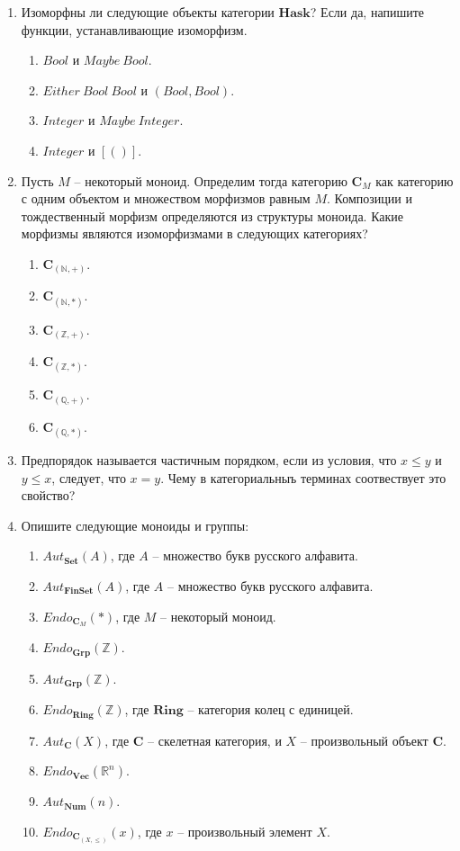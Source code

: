 \documentclass[draft]{article}
\newcommand{\cat}[1]{\mathbf{#1}}
\renewcommand{\C}{\cat{C}}
\newcommand{\Set}{\cat{Set}}
\newcommand{\FinSet}{\cat{FinSet}}
\newcommand{\Grp}{\cat{Grp}}
\newcommand{\Vec}{\cat{Vec}}
\newcommand{\Hask}{\cat{Hask}}
\newcommand{\Num}{\cat{Num}}
\begin{document}
\begin{enumerate}

\item Изоморфны ли следующие объекты категории $\Hask$? Если да, напишите функции, устанавливающие изоморфизм.
\begin{enumerate}
\item $Bool$ и $Maybe\ Bool$.
\item $Either\ Bool\ Bool$ и $(Bool, Bool)$.
\item $Integer$ и $Maybe\ Integer$.
\item $Integer$ и $[()]$.
\end{enumerate}

\item Пусть $M$ -- некоторый моноид.
Определим тогда категорию $\C_M$ как категорию с одним объектом и множеством морфизмов равным $M$.
Композиции и тождественный морфизм определяются из структуры моноида.
Какие морфизмы являются изоморфизмами в следующих категориях?
\begin{enumerate}
\item $\C_{(\mathbb{N},+)}$.
\item $\C_{(\mathbb{N},*)}$.
\item $\C_{(\mathbb{Z},+)}$.
\item $\C_{(\mathbb{Z},*)}$.
\item $\C_{(\mathbb{Q},+)}$.
\item $\C_{(\mathbb{Q},*)}$.
\end{enumerate}

\item Предпорядок называется частичным порядком, если из условия, что $x \leq y$ и $y \leq x$, следует, что $x = y$.
Чему в категориальныъ терминах соотвествует это свойство?

\item Опишите следующие моноиды и группы:
\begin{enumerate}
\item $Aut_\Set(A)$, где $A$ -- множество букв русского алфавита.
\item $Aut_{\FinSet}(A)$, где $A$ -- множество букв русского алфавита.
\item $Endo_{\C_M}(*)$, где $M$ -- некоторый моноид.
\item $Endo_\Grp(\mathbb{Z})$.
\item $Aut_\Grp(\mathbb{Z})$.
\item $Endo_\cat{Ring}(\mathbb{Z})$, где $\cat{Ring}$ -- категория колец с единицей.
\item $Aut_\C(X)$, где $\C$ -- скелетная категория, и $X$ -- произвольный объект $\C$.
\item $Endo_\Vec(\mathbb{R}^n)$.
\item $Aut_\Num(n)$.
\item $Endo_{\C_{(X,\leq)}}(x)$, где $x$ -- произвольный элемент $X$.
\end{enumerate}


\end{enumerate}
\end{document}
